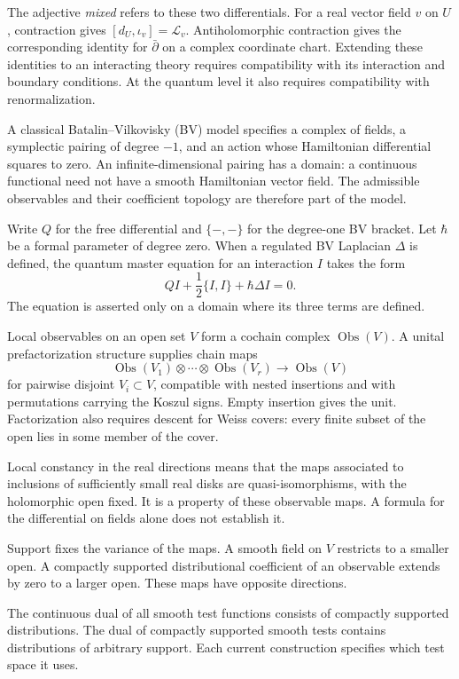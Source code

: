 The adjective \emph{mixed} refers to these two differentials. For a
real vector field $v$ on $U$, contraction gives
$[d_U,\iota_v]=\mathcal L_v$. Antiholomorphic contraction gives the
corresponding identity for $\bar\partial$ on a complex coordinate
chart. Extending these identities to an interacting theory requires
compatibility with its interaction and boundary conditions. At the
quantum level it also requires compatibility with renormalization.

A classical Batalin--Vilkovisky (BV) model specifies a complex of fields,
a symplectic pairing of degree $-1$, and an action whose Hamiltonian differential
squares to zero. An infinite-dimensional pairing has a domain: a
continuous functional need not have a smooth Hamiltonian vector field.
The admissible observables and their coefficient topology are therefore
part of the model.

Write $Q$ for the free differential and $\{-,-\}$ for the degree-one
BV bracket. Let $\hbar$ be a formal parameter of degree zero.
When a regulated BV Laplacian $\Delta$ is defined, the quantum master
equation for an interaction $I$ takes the form
\[
 QI+\frac12\{I,I\}+\hbar\Delta I=0.
\]
The equation is asserted only on a domain where its three terms
are defined.

Local observables on an open set $V$ form a cochain complex
$\operatorname{Obs}(V)$. A unital prefactorization structure supplies chain
maps
\[
 \operatorname{Obs}(V_1)\otimes\cdots\otimes
 \operatorname{Obs}(V_r)\longrightarrow\operatorname{Obs}(V)
\]
for pairwise disjoint $V_i\subset V$, compatible with nested insertions
and with permutations carrying the Koszul signs. Empty insertion gives
the unit. Factorization also requires descent for Weiss covers:
every finite subset of the open lies in some member of the cover.

Local constancy in the real directions means that the maps
associated to inclusions of sufficiently small real disks are
quasi-isomorphisms, with the holomorphic open fixed. It is a property
of these observable maps. A formula for the differential on fields
alone does not establish it.

Support fixes the variance of the maps. A smooth field on $V$ restricts
to a smaller open. A compactly supported distributional coefficient of
an observable extends by zero to a larger open. These maps have
opposite directions.

The continuous dual of all smooth test functions consists of compactly
supported distributions. The dual of compactly supported smooth tests
contains distributions of arbitrary support. Each current construction specifies which
test space it uses.

